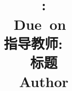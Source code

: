 \documentclass{article}
\title{
	\vspace{0.2in}
	\vspace{0.8cm}\\
	\textmd{\textbf{\hmwkClass: \hmwkTitle}}\\
	\normalsize\vspace{0.1in}\small{Due\ on\ \zhtoday}\\
	\vspace{0.1in}\large{指导教师: ~\textit{\hmwkClassInstructor\ \hmwkClassTime}}\\
	\vspace{0.5in}
	\Large{标题}\\
	\vspace{0.5in}	
	\large{Author}\\
	\vspace{0.2in}
	
}
\date{}
\begin{document}
\maketitle
\pagebreak
\tableofcontents
\pagebreak


\newpage

\pagebreak

\end{document}
